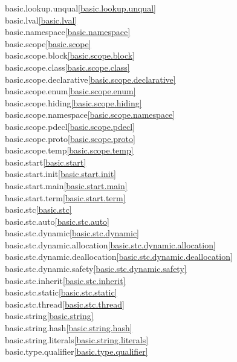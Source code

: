 \begin{multicols}{2}
basic.lookup.unqual\quad\ref{basic.lookup.unqual}\\
basic.lval\quad\ref{basic.lval}\\
basic.namespace\quad\ref{basic.namespace}\\
basic.scope\quad\ref{basic.scope}\\
basic.scope.block\quad\ref{basic.scope.block}\\
basic.scope.class\quad\ref{basic.scope.class}\\
basic.scope.declarative\quad\ref{basic.scope.declarative}\\
basic.scope.enum\quad\ref{basic.scope.enum}\\
basic.scope.hiding\quad\ref{basic.scope.hiding}\\
basic.scope.namespace\quad\ref{basic.scope.namespace}\\
basic.scope.pdecl\quad\ref{basic.scope.pdecl}\\
basic.scope.proto\quad\ref{basic.scope.proto}\\
basic.scope.temp\quad\ref{basic.scope.temp}\\
basic.start\quad\ref{basic.start}\\
basic.start.init\quad\ref{basic.start.init}\\
basic.start.main\quad\ref{basic.start.main}\\
basic.start.term\quad\ref{basic.start.term}\\
basic.stc\quad\ref{basic.stc}\\
basic.stc.auto\quad\ref{basic.stc.auto}\\
basic.stc.dynamic\quad\ref{basic.stc.dynamic}\\
basic.stc.dynamic.allocation\quad\ref{basic.stc.dynamic.allocation}\\
basic.stc.dynamic.deallocation\quad\ref{basic.stc.dynamic.deallocation}\\
basic.stc.dynamic.safety\quad\ref{basic.stc.dynamic.safety}\\
basic.stc.inherit\quad\ref{basic.stc.inherit}\\
basic.stc.static\quad\ref{basic.stc.static}\\
basic.stc.thread\quad\ref{basic.stc.thread}\\
basic.string\quad\ref{basic.string}\\
basic.string.hash\quad\ref{basic.string.hash}\\
basic.string.literals\quad\ref{basic.string.literals}\\
basic.type.qualifier\quad\ref{basic.type.qualifier}\\

\end{multicols}
